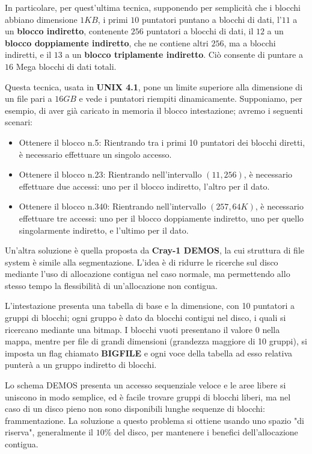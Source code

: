 \noindent In particolare, per quest'ultima tecnica, supponendo per semplicità che i blocchi abbiano dimensione $1KB$, i primi $10$ puntatori puntano a
blocchi di dati, l'$11$ a un \textbf{blocco indiretto}, contenente $256$ puntatori a blocchi di dati, il $12$ a un \textbf{blocco doppiamente indiretto},
che ne contiene altri $256$, ma a blocchi indiretti, e il $13$ a un \textbf{blocco triplamente indiretto}. Ciò consente di puntare a $16$ Mega blocchi
di dati totali.\par
Questa tecnica, usata in \textbf{UNIX 4.1}, pone un limite superiore alla dimensione di un file pari a $16GB$ e vede i puntatori riempiti dinamicamente.
Supponiamo, per esempio, di aver già caricato in memoria il blocco intestazione; avremo i seguenti scenari: \begin{itemize}
    \item Ottenere il blocco n.5: Rientrando tra i primi 10 puntatori dei blocchi diretti, è necessario effettuare un singolo accesso.
    \item Ottenere il blocco n.23: Rientrando nell'intervallo $(11, 256)$, è necessario effettuare due accessi: uno per il blocco indiretto, l'altro per
    il dato.
    \item Ottenere il blocco n.340: Rientrando nell'intervallo $(257, 64K)$, è necessario effettuare tre accessi: uno per il blocco doppiamente
    indiretto, uno per quello singolarmente indiretto, e l'ultimo per il dato.
\end{itemize}

\noindent Un'altra soluzione è quella proposta da \textbf{Cray-1 DEMOS}, la cui struttura di file system è simile alla segmentazione. L'idea è di
ridurre le ricerche sul disco mediante l'uso di allocazione contigua nel caso normale, ma permettendo allo stesso tempo la flessibilità di
un'allocazione non contigua.\par
L'intestazione presenta una tabella di base e la dimensione, con 10 puntatori a gruppi di blocchi; ogni gruppo è dato da blocchi contigui nel disco, i
quali si ricercano mediante una bitmap. I blocchi vuoti presentano il valore 0 nella mappa, mentre per file di grandi dimensioni (grandezza maggiore di
10 gruppi), si imposta un flag chiamato \textbf{BIGFILE} e ogni voce della tabella ad esso relativa punterà a un gruppo indiretto di blocchi.\par
Lo schema DEMOS presenta un accesso sequenziale veloce e le aree libere si uniscono in modo semplice, ed è facile trovare gruppi di blocchi liberi, ma
nel caso di un disco pieno non sono disponibili lunghe sequenze di blocchi: frammentazione. La soluzione a questo problema si ottiene usando uno spazio
"di riserva", generalmente il $10\%$ del disco, per mantenere i benefici dell'allocazione contigua.\newline

